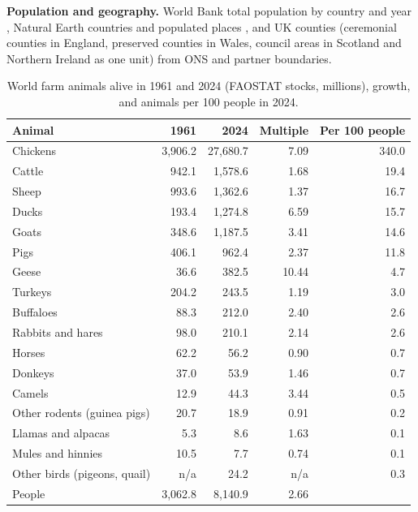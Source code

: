 \documentclass[11pt,a4paper]{article}
\begin{document}
\textbf{Population and geography.} World Bank total population by country and year \citep{wbpop}, Natural Earth countries and populated places \citep{naturalearth}, and UK counties (ceremonial counties in England, preserved counties in Wales, council areas in Scotland and Northern Ireland as one unit) from ONS and partner boundaries.

\begin{table}[tbp]\centering\small\caption{World farm animals alive in 1961 and 2024 (FAOSTAT stocks, millions), growth, and animals per 100 people in 2024.}\label{tab:world}\begin{tabular}{lrrrr}\toprule Animal & 1961 & 2024 & Multiple & Per 100 people\\\midrule
Chickens & 3,906.2 & 27,680.7 & 7.09 & 340.0\\
Cattle & 942.1 & 1,578.6 & 1.68 & 19.4\\
Sheep & 993.6 & 1,362.6 & 1.37 & 16.7\\
Ducks & 193.4 & 1,274.8 & 6.59 & 15.7\\
Goats & 348.6 & 1,187.5 & 3.41 & 14.6\\
Pigs & 406.1 & 962.4 & 2.37 & 11.8\\
Geese & 36.6 & 382.5 & 10.44 & 4.7\\
Turkeys & 204.2 & 243.5 & 1.19 & 3.0\\
Buffaloes & 88.3 & 212.0 & 2.40 & 2.6\\
Rabbits and hares & 98.0 & 210.1 & 2.14 & 2.6\\
Horses & 62.2 & 56.2 & 0.90 & 0.7\\
Donkeys & 37.0 & 53.9 & 1.46 & 0.7\\
Camels & 12.9 & 44.3 & 3.44 & 0.5\\
Other rodents (guinea pigs) & 20.7 & 18.9 & 0.91 & 0.2\\
Llamas and alpacas & 5.3 & 8.6 & 1.63 & 0.1\\
Mules and hinnies & 10.5 & 7.7 & 0.74 & 0.1\\
Other birds (pigeons, quail) & n/a & 24.2 & n/a & 0.3\\
\midrule People & 3,062.8 & 8,140.9 & 2.66 & \\\bottomrule\end{tabular}\end{table}
\end{document}
